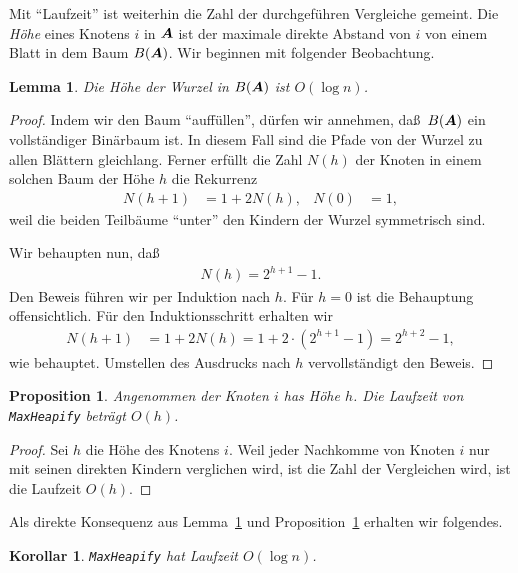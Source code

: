 \documentclass[10pt,reqno]{amsart}
\numberwithin{equation}{section}
\newcommand\vA{\vec A}
\def\vec#1{\mathchoice{\mbox{\boldmath$\displaystyle#1$}}
{\mbox{\boldmath$\textstyle#1$}}
{\mbox{\boldmath$\scriptstyle#1$}}
{\mbox{\boldmath$\scriptscriptstyle#1$}}}
\newtheorem{lemma}[definition]{Lemma}
\newtheorem{proposition}[definition]{Proposition}
\newtheorem{corollary}[definition]{Korollar}
\newcommand\Lem{Lemma}
\newcommand\Prop{Proposition}
\begin{document}
Mit ``Laufzeit'' ist weiterhin die Zahl der durchgef\"uhren Vergleiche gemeint.
Die {\em H\"ohe} eines Knotens $i$ in $\vA$ ist der maximale direkte Abstand von $i$ von einem Blatt in dem Baum $B(\vA)$.
Wir beginnen mit folgender Beobachtung.

\begin{lemma}\label{lemma_highheap}
	Die H\"ohe der Wurzel in $B(\vA)$ ist $O(\log n)$.
\end{lemma}
\begin{proof}
	Indem wir den Baum ``auff\"ullen'', d\"urfen wir annehmen, da\ss\ $B(\vA)$ ein vollst\"andiger Bin\"arbaum ist.
	In diesem Fall sind die Pfade von der Wurzel zu allen Bl\"attern gleichlang.
	Ferner erf\"ullt die Zahl $N(h)$ der Knoten in einem solchen Baum der H\"ohe $h$ die Rekurrenz
	\begin{align*}
		N(h+1)&=1+2N(h),&N(0)&=1,
	\end{align*}
	weil die beiden Teilb\"aume ``unter'' den Kindern der Wurzel symmetrisch sind.
	
	Wir behaupten nun, da\ss\
	\begin{align}\label{eqlemma_highheap}
		N(h)=2^{h+1}-1.
	\end{align}
	Den Beweis f\"uhren wir per Induktion nach $h$.
	F\"ur $h=0$ ist die Behauptung offensichtlich.
	F\"ur den Induktionsschritt erhalten wir
	\begin{align*}
		N(h+1)&=1+2N(h)=1+2\cdot(2^{h+1}-1)=2^{h+2}-1,
	\end{align*}
	wie behauptet.
	Umstellen des Ausdrucks nach $h$ vervollst\"andigt den Beweis.
\end{proof}

\begin{proposition}\label{prop_maxheapify}
	Angenommen der Knoten $i$ has H\"ohe $h$.
	Die Laufzeit von {\tt MaxHeapify} betr\"agt $O(h)$.
\end{proposition}
\begin{proof}
	Sei $h$ die H\"ohe des Knotens $i$.
	Weil jeder Nachkomme von Knoten $i$ nur mit seinen direkten Kindern verglichen wird, ist die Zahl der Vergleichen wird, ist die Laufzeit $O(h)$.
\end{proof}

Als direkte Konsequenz aus \Lem~\ref{lemma_highheap} und \Prop~\ref{prop_maxheapify} erhalten wir folgendes.

\begin{corollary}\label{cor_maxheapify}
	{\tt MaxHeapify} hat Laufzeit $O(\log n)$. 
\end{corollary}
\end{document}
